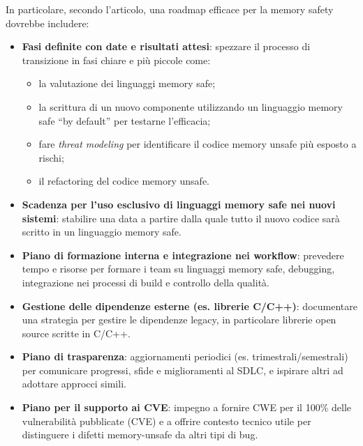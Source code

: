 In particolare, secondo l'articolo, una roadmap efficace per la memory safety
dovrebbe includere:

\begin{itemize}
  \item \textbf{Fasi definite con date e risultati attesi}: spezzare il processo
    di transizione in fasi chiare e più piccole come:
    \begin{itemize}
      \item la valutazione dei linguaggi memory safe;

      \item la scrittura di un nuovo componente utilizzando un linguaggio memory
        safe ``by default'' per testarne l'efficacia;

      \item fare \textit{threat modeling} per identificare il codice memory
        unsafe più esposto a rischi;

      \item il refactoring del codice memory unsafe.
    \end{itemize}

  \item \textbf{Scadenza per l'uso esclusivo di linguaggi memory safe nei nuovi
    sistemi}: stabilire una data a partire dalla quale tutto il nuovo codice sarà
    scritto in un linguaggio memory safe.

  \item \textbf{Piano di formazione interna e integrazione nei workflow}: prevedere
    tempo e risorse per formare i team su linguaggi memory safe, debugging, integrazione
    nei processi di build e controllo della qualità.

  \item \textbf{Gestione delle dipendenze esterne (es. librerie C/C++)}: documentare
    una strategia per gestire le dipendenze legacy, in particolare librerie open
    source scritte in C/C++.

  \item \textbf{Piano di trasparenza}: aggiornamenti periodici (es. trimestrali/semestrali)
    per comunicare progressi, sfide e miglioramenti al SDLC, e ispirare altri ad
    adottare approcci simili.

  \item \textbf{Piano per il supporto ai CVE}: impegno a fornire CWE per il 100\%
    delle vulnerabilità pubblicate (CVE) e a offrire contesto tecnico utile per
    distinguere i difetti memory-unsafe da altri tipi di bug.
\end{itemize}

